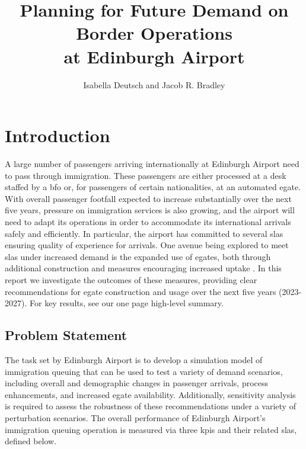 \documentclass[10pt]{article}
\title{Planning for Future Demand on Border Operations\\ at Edinburgh Airport}
\author{Isabella Deutsch and Jacob R. Bradley}
\date{}
\begin{document}
\maketitle

\section{Introduction}

A large number of passengers arriving internationally at Edinburgh Airport need to pass through immigration. These passengers are either processed at a desk staffed by a \gls{bfo} or, for passengers of certain nationalities, at an automated \gls{egate}. With overall passenger footfall expected to increase substantially over the next five years, pressure on immigration services is also growing, and the airport will need to adapt its operations in order to accommodate its international arrivals safely and efficiently. In particular, the airport has committed to several \glspl{sla} ensuring quality of experience for arrivals. One avenue being explored to meet \glspl{sla} under increased demand is the expanded use of \glspl{egate}, both through additional construction and measures encouraging increased uptake \cite{UK_border_2025}. In this report we investigate the outcomes of these measures, providing clear recommendations for \gls{egate} construction and usage over the next five years (2023-2027). For key results, see our one page high-level summary.

\subsection{Problem Statement}
The task set by Edinburgh Airport is to develop a simulation model of immigration queuing that can be used to test a variety of demand scenarios, including overall and demographic changes in passenger arrivals, process enhancements, and increased \gls{egate} availability. 
Additionally, sensitivity analysis is required to assess the robustness of these recommendations under a variety of perturbation scenarios.
The overall performance of Edinburgh Airport's immigration queuing operation is measured via three \glspl{kpi} and their related \glspl{sla}, defined below.
\end{document}
